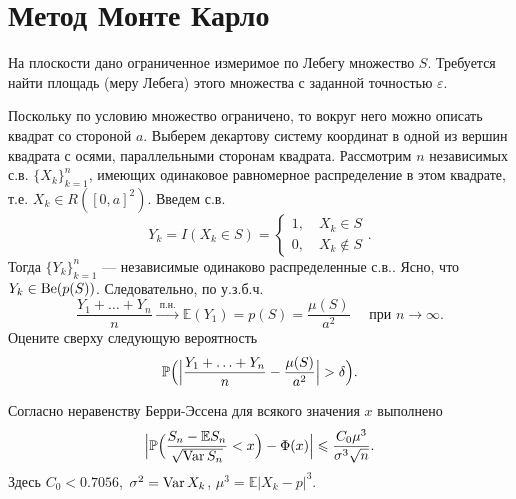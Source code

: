 \section{Метод Монте Карло}

\begin{problem}
На плоскости дано ограниченное измеримое по Лебегу множество $S$. Требуется найти площадь (меру Лебега) этого множества с заданной точностью 
$\varepsilon$. 

Поскольку по условию множество ограничено, то вокруг него можно описать квадрат со стороной $a$. Выберем декартову систему координат 
в одной из вершин квадрата с осями, параллельными сторонам квадрата. Рассмотрим $n$  независимых с.в. $\{ X_k\}_{k=1}^{n}$,  имеющих 
одинаковое равномерное распределение в этом квадрате, т.е. $X_k\in R([0,a]^2)$. Введем с.в. 
$$
Y_k=I(X_k\in S)=\begin{cases}
1,\quad X_k\in S\\
0, \quad X_k\notin S
\end{cases} . 
$$
Тогда $\{ Y_k\}_{k=1}^{n}$ --- независимые одинаково распределенные с.в.. Ясно, что $Y_k\in\mathrm{Be}(p(S))$. Следовательно, по у.з.б.ч. 
$$
\frac{Y_1+\ldots+Y_n}{n} \xrightarrow{\text{ п.н. }} {\mathbb E}(Y_1)=p(S)=\frac{\mu(S)}{a^2} \quad \text{ при  } n\to\infty . 
$$
Оцените сверху следующую вероятность
$$
{\mathbb P}\Bigl( \Bigl| \frac{Y_1+\ldots+Y_n}{n}-\frac{\mu(S)}{a^2}\Bigr|>\delta \Bigr) . 
$$
\end{problem}

\begin{ordre}

Согласно неравенству Берри-Эссена для всякого значения $x$ выполнено
$$
\Bigl| {\mathbb P}\Bigl( \frac{S_n-{\mathbb E}S_n}{\sqrt{\mathop{\mathrm{Var}}\nolimits S_n}}< x \Bigr)-\Phi(x)\Bigr| \leqslant
\frac{C_0 \mu^3}{\sigma^3\sqrt{n}} . 
$$
Здесь $C_0<0.7056$, $\,\sigma^2=\mathop{\mathrm{Var}}\nolimits X_k$, 
$
\mu^3={\mathbb E}|X_k-p|^3. 
$
\end{ordre}


